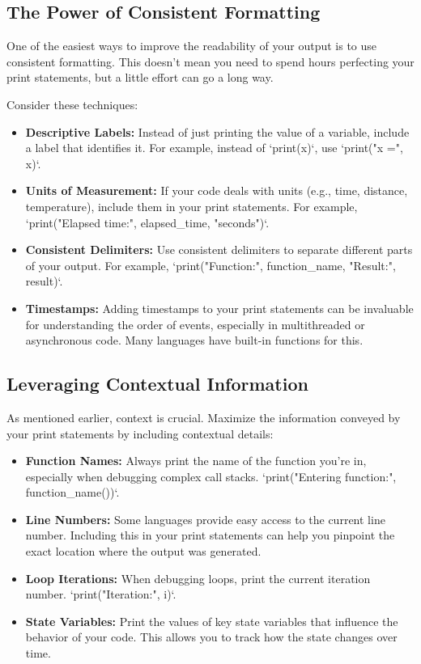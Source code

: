\documentclass{article}
\begin{document}
\subsection*{The Power of Consistent Formatting}

One of the easiest ways to improve the readability of your output is to use consistent formatting. This doesn't mean you need to spend hours perfecting your print statements, but a little effort can go a long way.

Consider these techniques:

\begin{itemize}
    \item \textbf{Descriptive Labels:} Instead of just printing the value of a variable, include a label that identifies it. For example, instead of `print(x)`, use `print("x =", x)`.
    \item \textbf{Units of Measurement:} If your code deals with units (e.g., time, distance, temperature), include them in your print statements. For example, `print("Elapsed time:", elapsed_time, "seconds")`.
    \item \textbf{Consistent Delimiters:} Use consistent delimiters to separate different parts of your output. For example, `print("Function:", function_name, "Result:", result)`.
    \item \textbf{Timestamps:} Adding timestamps to your print statements can be invaluable for understanding the order of events, especially in multithreaded or asynchronous code. Many languages have built-in functions for this.
\end{itemize}

\subsection*{Leveraging Contextual Information}

As mentioned earlier, context is crucial. Maximize the information conveyed by your print statements by including contextual details:

\begin{itemize}
    \item \textbf{Function Names:} Always print the name of the function you're in, especially when debugging complex call stacks. `print("Entering function:", function_name())`.
    \item \textbf{Line Numbers:}  Some languages provide easy access to the current line number. Including this in your print statements can help you pinpoint the exact location where the output was generated.
    \item \textbf{Loop Iterations:} When debugging loops, print the current iteration number. `print("Iteration:", i)`.
    \item \textbf{State Variables:} Print the values of key state variables that influence the behavior of your code. This allows you to track how the state changes over time.
\end{itemize}
\end{document}
